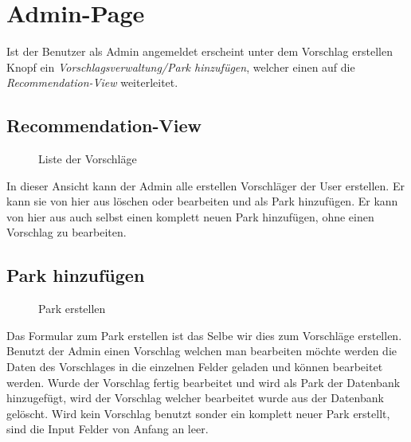\section{Admin-Page}
\label{adminpage}


Ist der Benutzer als Admin angemeldet erscheint unter dem Vorschlag erstellen Knopf ein 
\textit{Vorschlagsverwaltung/Park hinzufügen}, welcher einen auf die \textit{Recommendation-View}
weiterleitet. 


\subsection{Recommendation-View}

\begin{figure}[H]
    \begin{center}
      \caption{Liste der Vorschläge}
    \end{center}
\end{figure}

In dieser Ansicht kann der Admin alle erstellen Vorschläger der User erstellen. Er kann sie von hier 
aus löschen oder bearbeiten und als Park hinzufügen. Er kann von hier aus auch selbst einen komplett neuen
Park hinzufügen, ohne einen Vorschlag zu bearbeiten.

\subsection{Park hinzufügen}

\begin{figure}[H]
    \begin{center}
      \caption{Park erstellen}
    \end{center}
\end{figure}

Das Formular zum Park erstellen ist das Selbe wir dies zum Vorschläge erstellen. Benutzt der Admin einen 
Vorschlag welchen man bearbeiten möchte werden die Daten des Vorschlages in die einzelnen Felder 
geladen und können bearbeitet werden. Wurde der Vorschlag fertig bearbeitet und wird als Park der 
Datenbank hinzugefügt, wird der Vorschlag welcher bearbeitet wurde aus der Datenbank gelöscht. 
Wird kein Vorschlag benutzt sonder ein komplett neuer Park erstellt, sind die Input Felder von Anfang 
an leer.
